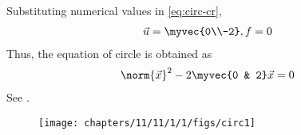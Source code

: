 Substituting numerical values in 
	\eqref{eq:circ-cr},
\begin{align}
	\vec{u} = \myvec{0\\-2},
	f 
	  = 0
\end{align}
Thus, the equation of circle is obtained as
\begin{align}
	\norm{\vec{x}}^2 - 2\myvec{0 & 2}\vec{x} = 0
\end{align}
See .
\begin{figure}[H]
	\begin{center} 
	    \texttt{[image: chapters/11/11/1/1/figs/circ1]}
	\end{center}
\caption{}
\label{fig:11/11/1/1/Fig1}
\end{figure}

